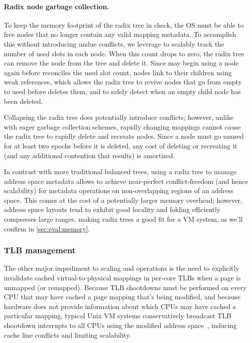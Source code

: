 \paragraph{Radix node garbage collection.}
To keep the memory footprint of the radix tree in check, the OS must be
able to free nodes that no longer contain any valid mapping metadata.
To accomplish this without introducing undue conflicts, we leverage
 to scalably track the number of used slots in each node.
When this count drops to zero, the radix tree can remove the node from
the tree and delete it.  Since \vm may begin using a node again before
 reconciles the used slot count, nodes link to their children
using weak references, which allows the radix tree to revive nodes
that go from empty to used before  deletes them, and to
safely detect when an empty child node has been deleted.

Collapsing the radix tree does potentially introduce conflicts;
however, unlike with eager garbage collection schemes, rapidly
changing
mappings cannot cause the radix tree to rapidly delete and recreate
nodes.  Since a node must go unused for at least two  epochs
before it is deleted, any cost of deleting or recreating it (and any
additional contention that results) is amortized.

In contrast with more traditional balanced trees, using a radix tree
to manage address space metadata allows \vm to achieve near-perfect
conflict-freedom (and hence scalability) for metadata operations on
non-overlapping regions of an address
space.  This comes at the cost of a potentially larger memory
overhead; however, address space layouts tend to exhibit good
locality and folding efficiently compresses large ranges, making radix
trees a good fit for a VM system, as we'll confirm in
\cref{sec:eval:memory}.

\subsubsection{TLB management}
\label{sec:radixvm:tlb}

The other major impediment to scaling  and 
operations is the need to explicitly invalidate cached
virtual-to-physical mappings in per-core TLBs when a page is unmapped
(or remapped).
%
Because TLB shootdowns must be performed on every CPU that may have
cached a page mapping that's being modified, and because hardware does
not provide
information about which CPUs may have cached a particular mapping,
typical Unix VM systems conservatively broadcast TLB shootdown
interrupts to all
CPUs using the modified address space~\cite{mach:tlb}, inducing cache
line conflicts
and limiting scalability.

